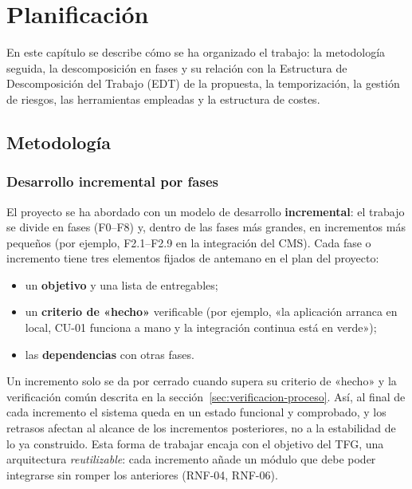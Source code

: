 
\chapter{Planificación}
\label{cap:planificacion}

En este capítulo se describe cómo se ha organizado el trabajo: la metodología
seguida, la descomposición en fases y su relación con la Estructura de
Descomposición del Trabajo (EDT) de la propuesta, la temporización, la gestión
de riesgos, las herramientas empleadas y la estructura de costes.

\section{Metodología}
\label{sec:metodologia}

\subsection{Desarrollo incremental por fases}

El proyecto se ha abordado con un modelo de desarrollo \textbf{incremental}:
el trabajo se divide en fases (F0--F8) y, dentro de las fases más grandes, en
incrementos más pequeños (por ejemplo, F2.1--F2.9 en la integración del CMS).
Cada fase o incremento tiene tres elementos fijados de antemano en el plan del
proyecto:

\begin{itemize}
  \item un \textbf{objetivo} y una lista de entregables;
  \item un \textbf{criterio de «hecho»} verificable (por ejemplo, «la
        aplicación arranca en local, CU-01 funciona a mano y la integración
        continua está en verde»);
  \item las \textbf{dependencias} con otras fases.
\end{itemize}

Un incremento solo se da por cerrado cuando supera su criterio de «hecho» y la
verificación común descrita en la sección~\ref{sec:verificacion-proceso}. Así,
al final de cada incremento el sistema queda en un estado funcional y
comprobado, y los retrasos afectan al alcance de los incrementos posteriores,
no a la estabilidad de lo ya construido. Esta forma de trabajar encaja con el
objetivo del TFG, una arquitectura \emph{reutilizable}: cada incremento añade
un módulo que debe poder integrarse sin romper los anteriores (RNF-04,
RNF-06).

